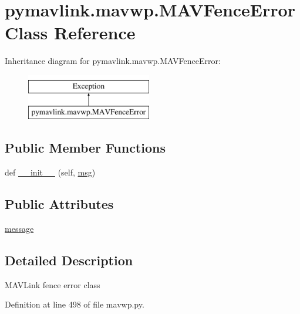 \hypertarget{classpymavlink_1_1mavwp_1_1MAVFenceError}{}\section{pymavlink.\+mavwp.\+M\+A\+V\+Fence\+Error Class Reference}
\label{classpymavlink_1_1mavwp_1_1MAVFenceError}
Inheritance diagram for pymavlink.\+mavwp.\+M\+A\+V\+Fence\+Error\+:\begin{figure}[H]
\begin{center}
\leavevmode
\includegraphics[height=2.000000cm]{classpymavlink_1_1mavwp_1_1MAVFenceError}
\end{center}
\end{figure}
\subsection*{Public Member Functions}
\begin{DoxyCompactItemize}
\item 
def \mbox{\hyperlink{classpymavlink_1_1mavwp_1_1MAVFenceError_aabdf0e25a42b3bd0429299ba0f041280}{\+\_\+\+\_\+init\+\_\+\+\_\+}} (self, \mbox{\hyperlink{stratnode_8cpp_a82cfe4ed9bc9e1b07c8bf209c324d85b}{msg}})
\end{DoxyCompactItemize}
\subsection*{Public Attributes}
\begin{DoxyCompactItemize}
\item 
\mbox{\hyperlink{classpymavlink_1_1mavwp_1_1MAVFenceError_aa94a26ad55aed2b325444967ea283e95}{message}}
\end{DoxyCompactItemize}


\subsection{Detailed Description}
\begin{DoxyVerb}MAVLink fence error class\end{DoxyVerb}
 

Definition at line 498 of file mavwp.\+py.



